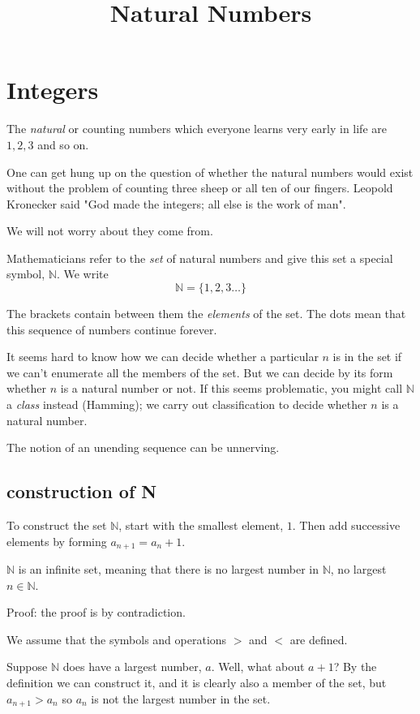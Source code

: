 \documentclass[11pt, oneside]{article}
\title{Natural Numbers}
\date{}
\begin{document}
\maketitle
\Large
\section*{Integers}

The \emph{natural} or counting numbers which everyone learns very early in life are $1, 2, 3$ and so on.

One can get hung up on the question of whether the natural numbers would exist without the problem of counting three sheep or all ten of our fingers.  Leopold Kronecker said "God made the integers; all else is the work of man".

We will not worry about they come from.

Mathematicians refer to the \emph{set} of natural numbers and give this set a special symbol, $\mathbb{N}$.  We write
\[ \mathbb{N} = \{ 1, 2, 3 \dots \} \]

The brackets contain between them the \emph{elements} of the set. The dots mean that this sequence of numbers continue forever.

It seems hard to know how we can decide whether a particular $n$ is in the set if we can't enumerate all the members of the set.  But we can decide by its form whether $n$ is a natural number or not.  If this seems problematic, you might call $\mathbb{N}$ a \emph{class} instead (Hamming);  we carry out classification to decide whether $n$ is a natural number.

The notion of an unending sequence can be unnerving.  

\subsection*{construction of N}

To construct the set $\mathbb{N}$, start with the smallest element, $1$.  Then add successive elements by forming $a_{n+1} = a_n + 1$.

$\mathbb{N}$ is an infinite set, meaning that there is no largest number in $\mathbb{N}$, no largest $n \in \mathbb{N}$.

Proof:  the proof is by contradiction.

We assume that the symbols and operations $>$ and $<$ are defined.

Suppose $\mathbb{N}$ does have a largest number, $a$.  Well, what about $a + 1$?  By the definition we can construct it, and it is clearly also a member of the set, but $a_{n+1} > a_n$ so $a_n$ is not the largest number in the set.
\end{document}
